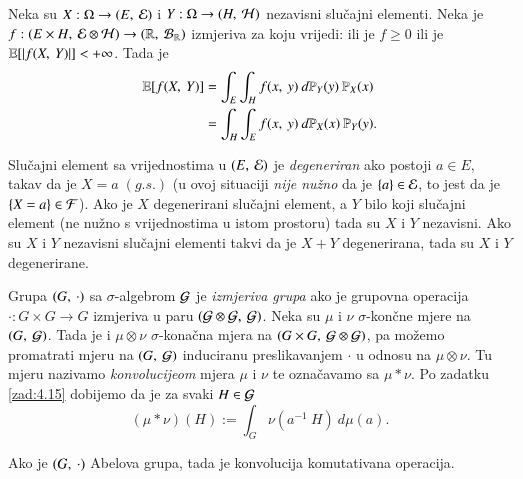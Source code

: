 \begin{zad} \label{zad:7.10}
    Neka su $X : \Omega \to ({E}, \: {\mathcal{E}})$ i $Y : \Omega \to ({H}, \: {\mathcal{H}})$ nezavisni slu\v cajni elementi.
    Neka je $f : ({E \times H}, \: {\mathcal{E} \otimes \mathcal{H}}) \to ({\mathbb{R}}, \: {\mathcal{B}_{\mathbb{R}}})$ izmjeriva za koju vrijedi:
    ili je $f \geq 0$ ili je $\mathbb{E} [|f ({X}, \: {Y})|] < +\infty$.
    Tada je
    \begin{align*}
        \mathbb{E} [ f ({X}, \: {Y}) ]
        &= \int_{E} \int_{H} f ({x}, \: {y}) \: d \mathbb{P}_Y (y) \: \mathbb{P}_X (x) \\
        &= \int_H \int_E f ({x}, \: {y}) \: d \mathbb{P}_X (x) \: \mathbb{P}_Y (y).
    \end{align*}
\end{zad}

\begin{zad} \label{zad:7.11}
    Slu\v cajni element sa vrijednostima u $({E}, \: {\mathcal{E}})$ je \emph{degeneriran} ako postoji $a \in E$, takav da je $X = a \; (g.s.)$ (u ovoj situaciji \emph{nije nu\v zno} da je $\{a\} \in \mathcal{E}$, to jest da je $\{X = a\} \in \mathcal{F}$).
    Ako je $X$ degenerirani slu\v cajni element, a $Y$ bilo koji slu\v cajni element (ne nu\v zno s vrijednostima u istom prostoru) tada su $X$ i $Y$ nezavisni.
    Ako su $X$ i $Y$ nezavisni slu\v cajni elementi takvi da je $X + Y$ degenerirana, tada su $X$ i $Y$ degenerirane.
\end{zad}


Grupa $({G}, \: {\cdot})$ sa $\sigma$-algebrom $\mathcal{G}$ je \emph{izmjeriva grupa} ako je grupovna operacija $\cdot : G \times G \to G$ izmjeriva u paru $({\mathcal{G} \otimes \mathcal{G}}, \: {\mathcal{G}})$.
Neka su $\mu$ i $\nu$ $\sigma$-kon\v cne mjere na $({G}, \: {\mathcal{G}})$.
Tada je i $\mu \otimes \nu$ $\sigma$-kona\v cna mjera na $({G \times G}, \: {\mathcal{G} \otimes \mathcal{G}})$, pa mo\v zemo promatrati mjeru na $({G}, \: {\mathcal{G}})$ induciranu preslikavanjem $\cdot$ u odnosu na $\mu \otimes \nu$.
Tu mjeru nazivamo \emph{konvolucijeom} mjera $\mu$ i $\nu$ te ozna\v cavamo sa $\mu * \nu$.
Po zadatku \ref{zad:4.15} dobijemo da je za svaki $H \in \mathcal{G}$
\begin{equation*}   \label{jed:7.12}
    (\mu * \nu)(H) := \int_G \nu (a^{-1} \: H) \: d \mu (a).
\end{equation*}

\begin{zad} \label{zad:7.13}
    Ako je $({G}, \: {\cdot})$ Abelova grupa, tada je konvolucija komutativana operacija.
\end{zad}

